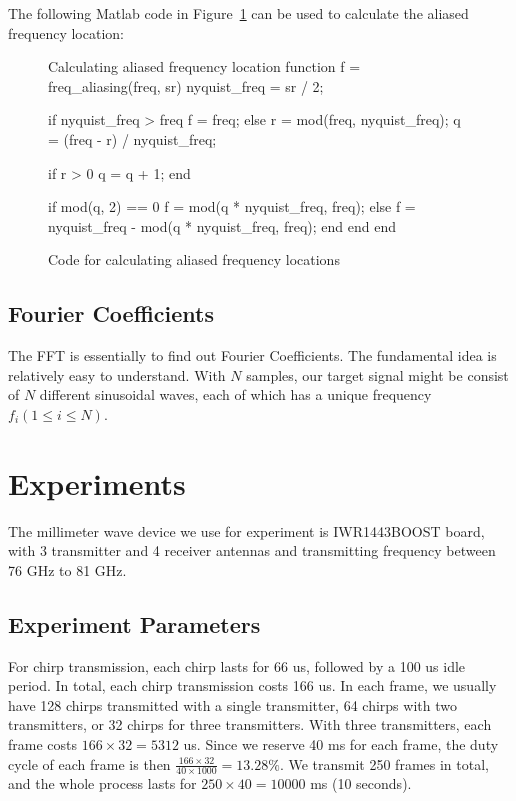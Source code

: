 \documentclass[11pt, oneside]{article}   	%
\begin{document}
The following Matlab code in Figure~\ref{fig:aliasing-code} can be used to calculate the aliased frequency location:
\begin{figure}[ht]
\begin{sexylisting}[colback=white]{Calculating aliased frequency location}
function f = freq_aliasing(freq, sr)
    nyquist_freq = sr / 2;

    if nyquist_freq > freq
        f = freq;
    else
        r = mod(freq, nyquist_freq);
        q = (freq - r) / nyquist_freq;

        if r > 0
            q = q + 1;
        end

        if mod(q, 2) == 0
            f = mod(q * nyquist_freq, freq);
        else
            f = nyquist_freq - mod(q * nyquist_freq, freq);
        end
    end
end
\end{sexylisting}
\caption{Code for calculating aliased frequency locations}
\label{fig:aliasing-code}
\end{figure}


\subsection{Fourier Coefficients}

The FFT is essentially to find out Fourier Coefficients. The fundamental idea is relatively easy to understand. With $N$ samples, our target signal might be consist of  $N$ different sinusoidal waves, each of which has a unique frequency $f_i (1 \le i \le N)$.



\section{Experiments}
The millimeter wave device we use for experiment is IWR1443BOOST board, with 3 transmitter and 4 receiver antennas and transmitting frequency between 76 GHz to 81 GHz.

\subsection{Experiment Parameters}

For chirp transmission, each chirp lasts for 66 us, followed by a 100 us idle period. In total, each chirp transmission costs 166 us. In each frame, we usually have 128 chirps transmitted with a single transmitter, 64 chirps with two transmitters, or 32 chirps for three transmitters. With three transmitters, each frame costs $166\times 32 = 5312$ us. Since we reserve 40 ms for each frame, the duty cycle of each frame is then $\frac{166\times 32}{40\times 1000} = 13.28\%.$ We transmit 250 frames in total, and the whole process lasts for $250 \times 40 = 10000$ ms (10 seconds).
\end{document}
